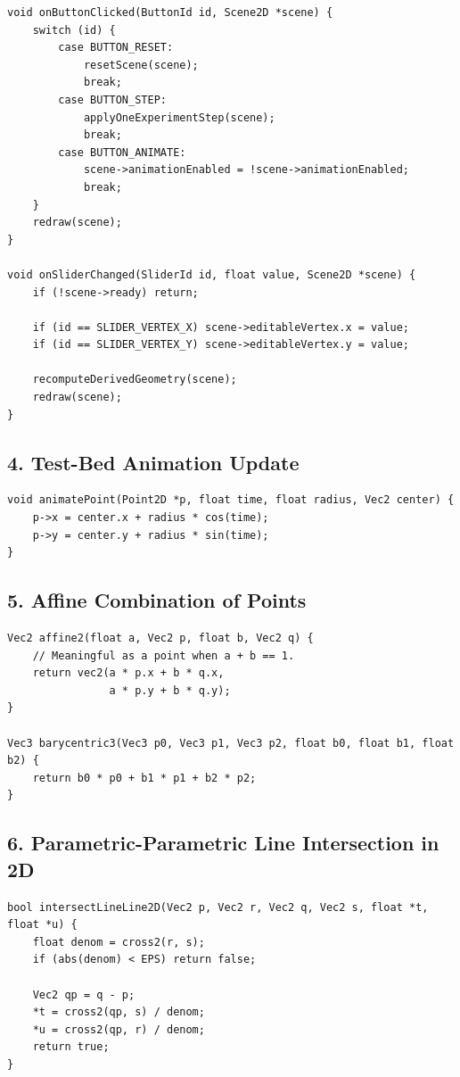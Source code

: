 \documentclass[10pt,letterpaper]{article}
\begin{document}
\begin{verbatim}
void onButtonClicked(ButtonId id, Scene2D *scene) {
    switch (id) {
        case BUTTON_RESET:
            resetScene(scene);
            break;
        case BUTTON_STEP:
            applyOneExperimentStep(scene);
            break;
        case BUTTON_ANIMATE:
            scene->animationEnabled = !scene->animationEnabled;
            break;
    }
    redraw(scene);
}

void onSliderChanged(SliderId id, float value, Scene2D *scene) {
    if (!scene->ready) return;

    if (id == SLIDER_VERTEX_X) scene->editableVertex.x = value;
    if (id == SLIDER_VERTEX_Y) scene->editableVertex.y = value;

    recomputeDerivedGeometry(scene);
    redraw(scene);
}
\end{verbatim}

\subsection{4. Test-Bed Animation Update}

\begin{verbatim}
void animatePoint(Point2D *p, float time, float radius, Vec2 center) {
    p->x = center.x + radius * cos(time);
    p->y = center.y + radius * sin(time);
}
\end{verbatim}

\subsection{5. Affine Combination of Points}

\begin{verbatim}
Vec2 affine2(float a, Vec2 p, float b, Vec2 q) {
    // Meaningful as a point when a + b == 1.
    return vec2(a * p.x + b * q.x,
                a * p.y + b * q.y);
}

Vec3 barycentric3(Vec3 p0, Vec3 p1, Vec3 p2, float b0, float b1, float b2) {
    return b0 * p0 + b1 * p1 + b2 * p2;
}
\end{verbatim}

\subsection{6. Parametric-Parametric Line Intersection in 2D}

\begin{verbatim}
bool intersectLineLine2D(Vec2 p, Vec2 r, Vec2 q, Vec2 s, float *t, float *u) {
    float denom = cross2(r, s);
    if (abs(denom) < EPS) return false;

    Vec2 qp = q - p;
    *t = cross2(qp, s) / denom;
    *u = cross2(qp, r) / denom;
    return true;
}
\end{verbatim}
\end{document}
